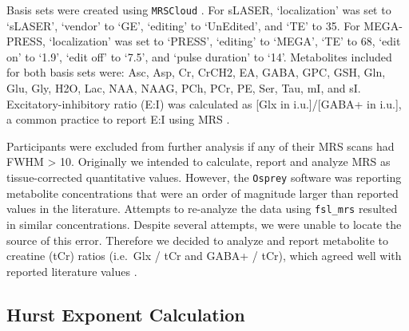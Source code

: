 \documentclass[
true
]{sn-jnl}
\begin{document}
Basis sets were created using \texttt{MRSCloud}
\citep{huiMRSCloudCloudbasedMRS2022, moriMRICloudDeliveringHighThroughput2016}.
For sLASER, `localization' was set to `sLASER', `vendor' to `GE',
`editing' to `UnEdited', and `TE' to 35. For MEGA-PRESS, `localization'
was set to `PRESS', `editing' to `MEGA', `TE' to 68, `edit on' to `1.9',
`edit off' to `7.5', and `pulse duration' to `14'. Metabolites included
for both basis sets were: Asc, Asp, Cr, CrCH2, EA, GABA, GPC, GSH, Gln,
Glu, Gly, H2O, Lac, NAA, NAAG, PCh, PCr, PE, Ser, Tau, mI, and sI.
Excitatory-inhibitory ratio (E:I) was calculated as {[}Glx in
i.u.{]}/{[}GABA+ in i.u.{]}, a common practice to report E:I using MRS
\citep{rideauxNoBalanceGlutamate+glutamine2021}.

Participants were excluded from further analysis if any of their MRS
scans had FWHM \textgreater{} 10. Originally we intended to calculate,
report and analyze MRS as tissue-corrected quantitative values. However,
the \texttt{Osprey} software was reporting metabolite concentrations
that were an order of magnitude larger than reported values in the
literature. Attempts to re-analyze the data using \texttt{fsl\_mrs}
\citep{clarkeFSLMRSEndtoendSpectroscopy2021} resulted in similar
concentrations. Despite several attempts, we were unable to locate the
source of this error. Therefore we decided to analyze and report
metabolite to creatine (tCr) ratios (i.e.~Glx / tCr and GABA+ / tCr),
which agreed well with reported literature values
\citep{boillatMetaboliteConcentrationChanges2020, dwyerSimultaneousMeasurementBOLD2021, martinez-maestroDynamicMetabolicChanges2019, mekleDetectionMetaboliteChanges2017, schallerNetIncreaseLactate2013}.

\subsection{Hurst Exponent
Calculation}\label{hurst-exponent-calculation}
\end{document}
